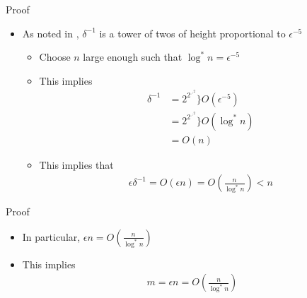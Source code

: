 \begin{frame}{Proof}
\begin{itemize}
	\item As noted in \cite{..}, $\delta^{-1}$ is a tower of twos of height proportional to $\epsilon^{-5}$
	\begin{itemize}
		\item Choose $n$ large enough such that $\log^* n = \epsilon^{-5}$
		\item This implies 
		\begin{align*}
			\delta^{-1} &= 2^{2^{\iddots^2}} \bigg\rbrace O(\epsilon^{-5})\\
			&= 2^{2^{\iddots^2}} \bigg\rbrace O(\log^* n)\\
			&= O(n)
		\end{align*}
		\item This implies that
		\begin{align*}
			\epsilon \delta^{-1} = O(\epsilon n) = O\left(\frac{n}{\log^* n}\right) < n
		\end{align*}
	\end{itemize}
\end{itemize}
\end{frame}

\begin{frame}{Proof}
\begin{itemize}
	\item In particular, $\epsilon n = O\left(\frac{n}{\log^* n}\right)$
	\item This implies
	\begin{align*}
		m = \epsilon n = O\left(\frac{n}{\log^* n}\right)
	\end{align*}
\end{itemize}
\end{frame}




